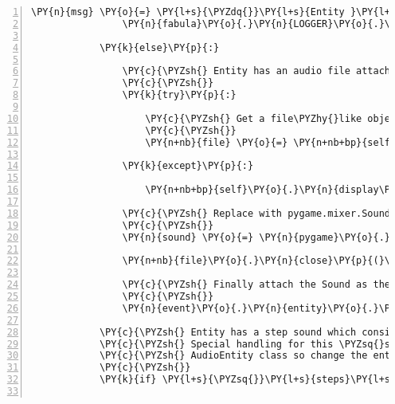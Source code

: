 \begin{Verbatim}[commandchars=\\\{\},numbers=left,firstnumber=1,stepnumber=1]
                \PY{n}{msg} \PY{o}{=} \PY{l+s}{\PYZdq{}}\PY{l+s}{Entity }\PY{l+s}{\PYZsq{}}\PY{l+s}{\PYZob{}\PYZcb{}}\PY{l+s}{\PYZsq{}}\PY{l+s}{ already has an audio asset}\PY{l+s}{\PYZdq{}}
                \PY{n}{fabula}\PY{o}{.}\PY{n}{LOGGER}\PY{o}{.}\PY{n}{info}\PY{p}{(}\PY{n}{msg}\PY{o}{.}\PY{n}{format}\PY{p}{(}\PY{n}{event}\PY{o}{.}\PY{n}{entity}\PY{o}{.}\PY{n}{identifier}\PY{p}{)}\PY{p}{)}

            \PY{k}{else}\PY{p}{:}

                \PY{c}{\PYZsh{} Entity has an audio file attached, fetch the asset}
                \PY{c}{\PYZsh{}}
                \PY{k}{try}\PY{p}{:}

                    \PY{c}{\PYZsh{} Get a file\PYZhy{}like object from asset manager}
                    \PY{c}{\PYZsh{}}
                    \PY{n+nb}{file} \PY{o}{=} \PY{n+nb+bp}{self}\PY{o}{.}\PY{n}{assets}\PY{o}{.}\PY{n}{fetch}\PY{p}{(}\PY{n}{event}\PY{o}{.}\PY{n}{entity}\PY{o}{.}\PY{n}{assets}\PY{p}{[}\PY{l+s}{\PYZsq{}}\PY{l+s}{audio/ogg}\PY{l+s}{\PYZsq{}}\PY{p}{]}\PY{o}{.}\PY{n}{uri}\PY{p}{)}

                \PY{k}{except}\PY{p}{:}

                    \PY{n+nb+bp}{self}\PY{o}{.}\PY{n}{display\PYZus{}asset\PYZus{}exception}\PY{p}{(}\PY{n}{event}\PY{o}{.}\PY{n}{entity}\PY{o}{.}\PY{n}{assets}\PY{p}{[}\PY{l+s}{\PYZsq{}}\PY{l+s}{audio/ogg}\PY{l+s}{\PYZsq{}}\PY{p}{]}\PY{o}{.}\PY{n}{uri}\PY{p}{)}

                \PY{c}{\PYZsh{} Replace with pygame.mixer.Sound from file}
                \PY{c}{\PYZsh{}}
                \PY{n}{sound} \PY{o}{=} \PY{n}{pygame}\PY{o}{.}\PY{n}{mixer}\PY{o}{.}\PY{n}{Sound}\PY{p}{(}\PY{n+nb}{file}\PY{p}{)}

                \PY{n+nb}{file}\PY{o}{.}\PY{n}{close}\PY{p}{(}\PY{p}{)}

                \PY{c}{\PYZsh{} Finally attach the Sound as the Entity\PYZsq{}s asset}
                \PY{c}{\PYZsh{}}
                \PY{n}{event}\PY{o}{.}\PY{n}{entity}\PY{o}{.}\PY{n}{assets}\PY{p}{[}\PY{l+s}{\PYZsq{}}\PY{l+s}{audio/ogg}\PY{l+s}{\PYZsq{}}\PY{p}{]}\PY{o}{.}\PY{n}{data} \PY{o}{=} \PY{n}{sound}

            \PY{c}{\PYZsh{} Entity has a step sound which consists of a left and a right step.}
            \PY{c}{\PYZsh{} Special handling for this \PYZsq{}sound animation\PYZsq{} is done in the}
            \PY{c}{\PYZsh{} AudioEntity class so change the entity\PYZsq{}s class to support steps.}
            \PY{c}{\PYZsh{}}
            \PY{k}{if} \PY{l+s}{\PYZsq{}}\PY{l+s}{steps}\PY{l+s}{\PYZsq{}} \PY{o+ow}{in} \PY{n}{event}\PY{o}{.}\PY{n}{entity}\PY{o}{.}\PY{n}{assets}\PY{p}{[}\PY{l+s}{\PYZsq{}}\PY{l+s}{audio/ogg}\PY{l+s}{\PYZsq{}}\PY{p}{]}\PY{o}{.}\PY{n}{uri}\PY{p}{:}


\end{Verbatim}
